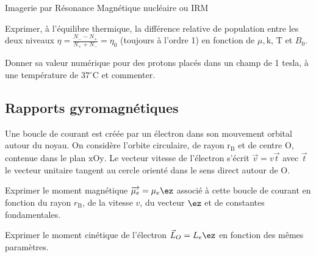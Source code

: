 \begin{exo}[PC][1][devoir]{Imagerie par Résonance Magnétique nucléaire ou IRM}
\begin{quest}
\item Exprimer, à l'équilibre thermique, la différence relative de population entre les deux niveaux $\eta=\frac{N_{-}-N_{+}}{N_{+}+N_{-}}=\eta_{0}$ (toujours à l'ordre 1) en fonction de $\mu, \mathrm{k}$, $\mathrm{T}$ et $B_0$.

\item Donner sa valeur numérique pour des protons placés dans un champ de 1 tesla, à une température de $37^{\circ} \mathrm{C}$ et commenter.
\end{quest}

\subsection{Rapports gyromagnétiques}
Une boucle de courant est créée par un électron dans son mouvement orbital autour du noyau. On considère l'orbite circulaire, de rayon $\mathrm{r}_{\mathrm{B}}$ et de centre $\mathrm{O}$, contenue dans le plan $\mathrm{xOy}$. Le vecteur vitesse de l'électron s'écrit $\vec{v}=v \vec{t}$ avec $\vec{t}$ le vecteur unitaire tangent au cercle orienté dans le sens direct autour de O.
\begin{quest}
	\item Exprimer le moment magnétique $\overrightarrow{\mu_{e}}=\mu_{e} \ez$ associé à cette boucle de courant en fonction du rayon $r_{\mathrm{B}}$, de la vitesse ${v}$, du vecteur $\ez$ et de constantes fondamentales.

	\item Exprimer le moment cinétique de l'électron $\Vec{L}_O = L_e \ez$ en fonction des mêmes paramètres.


\end{quest}
\end{exo}
